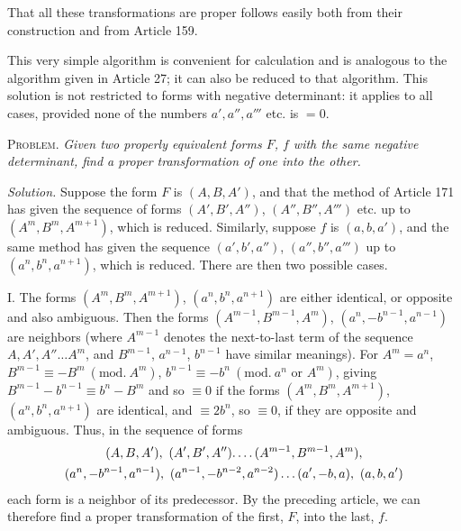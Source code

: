 That all these transformations are proper follows easily both from their construction and from Article 159.

This very simple algorithm is convenient for calculation and is analogous to the algorithm given in Article 27; it can also be reduced to that algorithm. This solution
is not restricted to forms with negative determinant: it applies to all cases, provided none of the numbers $a',a'',a'''$ etc. is $=0$.

\textsc{Problem.} \emph{Given two properly equivalent forms $F$, $f$ with the same negative determinant, find a proper transformation of one into the other.}

\emph{Solution.} Suppose the form $F$ is $(A,B,A')$, and that the method of Article 171 has given the sequence of forms $(A',B',A'')$, $(A'',B'',A''')$ etc. up to $(A^m,B^m,A^{m+1})$, which is reduced. Similarly, suppose $f$ is $(a,b,a')$, and the same method has given the sequence $(a',b',a'')$, $(a'',b'',a''')$ up to $(a^n,b^n,a^{n+1})$, which is reduced. There are then two possible cases.

I. The forms $(A^m,B^m,A^{m+1})$, $(a^n,b^n,a^{n+1})$ are either identical, or opposite and also ambiguous. Then the forms $(A^{m-1},B^{m-1},A^m)$, $(a^n,-b^{n-1},a^{n-1})$ are neighbors (where $A^{m-1}$ denotes the next-to-last term of the sequence $A,A',A''\ldots A^m$, and $B^{m-1}$, $a^{n-1}$, $b^{n-1}$ have similar meanings). For $A^m=a^n$, $B^{m-1}\equiv-B^m\ (\mathrm{mod.}\ A^m)$, $b^{n-1}\equiv-b^n\ (\mathrm{mod.}\ a^n\text{ or }A^m)$, giving $B^{m-1}-b^{n-1}\equiv b^n-B^m$ and so $\equiv0$ if the forms $(A^m,B^m,A^{m+1})$, $(a^n,b^n,a^{n+1})$ are identical, and $\equiv2b^n$, so $\equiv0$, if they are opposite and ambiguous. Thus, in the sequence of forms
\[
\begin{gathered}
(A,B,A'),\ (A',B',A'')\ldotp\ldotp\ldotp\ldotp(A^{m-1},B^{m-1},A^m),\\
(a^n,-b^{n-1},a^{n-1}),\ (a^{n-1},-b^{n-2},a^{n-2})\ldots(a',-b,a),\ (a,b,a')
\end{gathered}
\]
each form is a neighbor of its predecessor. By the preceding article, we can therefore find a proper transformation of the first, $F$, into the last, $f$.


